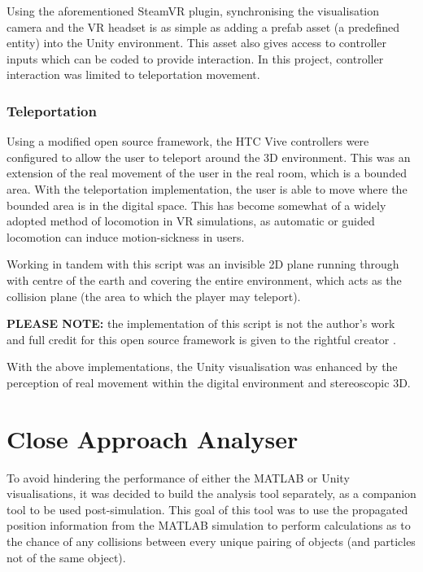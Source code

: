 \documentclass[12pt,openany,a4paper]{book}
\begin{document}
		Using the aforementioned SteamVR plugin, synchronising the visualisation camera and the VR headset is as simple as adding a prefab asset (a predefined entity) into the Unity environment. This asset also gives access to controller inputs which can be coded to provide interaction. In this project, controller interaction was limited to teleportation movement.
				
		\subsubsection{Teleportation}
		Using a modified open source framework, the HTC Vive controllers were configured to allow the user to teleport around the 3D environment. This was an extension of the real movement of the user in the real room, which is a bounded area. With the teleportation implementation, the user is able to move where the bounded area is in the digital space. This has become somewhat of a widely adopted method of locomotion in VR simulations, as automatic or guided locomotion can induce motion-sickness in users. \newline
		
		Working in tandem with this script was an invisible 2D plane running through with centre of the earth and covering the entire environment, which acts as the collision plane (the area to which the player may teleport). \newline
		
		\textbf{PLEASE NOTE:} the implementation of this script is not the author's work and full credit for this open source framework is given to the rightful creator \cite{tele}. \newline
		
		With the above implementations, the Unity visualisation was enhanced by the perception of real movement within the digital environment and stereoscopic 3D.
		
		
		\section{Close Approach Analyser}
		
		To avoid hindering the performance of either the MATLAB or Unity visualisations, it was decided to build the analysis tool separately, as a companion tool to be used post-simulation. This goal of this tool was to use the propagated position information from the MATLAB simulation to perform calculations as to the chance of any collisions between every unique pairing of objects (and particles not of the same object). \newline
		
\end{document}
